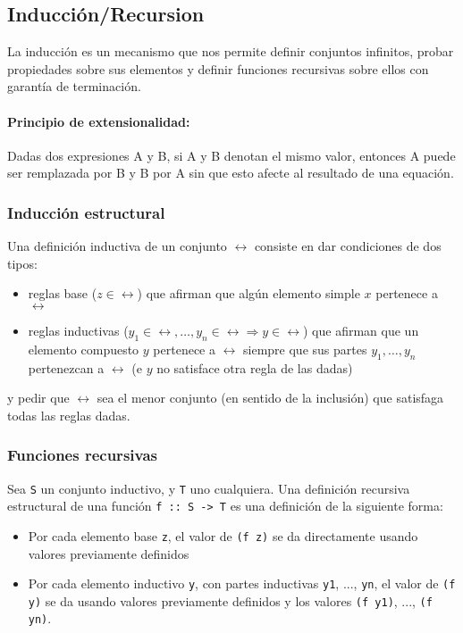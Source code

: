 \subsection{Inducción/Recursion}

La inducción es un mecanismo que nos permite definir conjuntos infinitos, probar propiedades sobre sus elementos y definir funciones recursivas sobre ellos con garantía de terminación.

\paragraph{Principio de extensionalidad:} Dadas dos expresiones A y B, si A y B denotan el mismo valor, entonces A puede ser remplazada por B y B por A sin que esto afecte al resultado de una equación.

\subsubsection{Inducción estructural}
Una definición inductiva de un conjunto $\rel$ consiste en dar condiciones de dos tipos:
\begin{itemize}
	\item reglas base ($z\in\rel$) que afirman que algún elemento simple $x$ pertenece a $\rel$
	\item reglas inductivas ($y_1\in\rel,\dots,y_n\in\rel\Rightarrow y\in\rel$) que afirman que un elemento compuesto $y$ pertenece a
	$\rel$ siempre que sus partes $y_1,\dots,y_n$ pertenezcan a $\rel$
	(e $y$ no satisface otra regla de las dadas)
\end{itemize}

y pedir que $\rel$ sea el menor conjunto (en sentido de
la inclusión) que satisfaga todas las reglas dadas.

\subsubsection{Funciones recursivas}
Sea \texttt{S} un conjunto inductivo, y \texttt{T} uno cualquiera. Una definición recursiva estructural de una función \texttt{f :: S -> T} es una definición de la siguiente forma:
\begin{itemize}
	\item Por cada elemento base \texttt{z}, el valor de \texttt{(f z)} se da directamente usando valores previamente definidos
	\item Por cada elemento inductivo \texttt{y}, con partes inductivas \texttt{y1}, ..., \texttt{yn}, el valor de \texttt{(f y)} se da usando valores previamente definidos y los valores \texttt{(f y1)}, ..., \texttt{(f yn)}.
\end{itemize}

